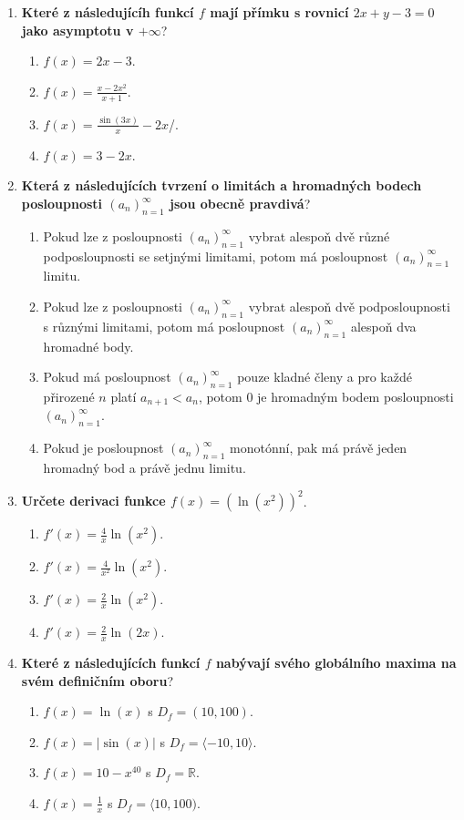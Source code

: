 \documentclass{article}
\begin{document}
\begin{enumerate}
    \item \textbf{Které z následujícíh funkcí $f$ mají přímku s rovnicí $2x + y - 3 = 0$ jako asymptotu v $+\infty$}?
    \begin{enumerate}
        \item $f(x) = 2x - 3$.
        \item $f(x) = \frac{x - 2x^2}{x+1}$.
        \item $f(x) = \frac{\sin(3x)}{x} - 2x$/.
        \item $f(x) = 3 - 2x$.
    \end{enumerate}

    \pagebreak
    
    \item \textbf{Která z následujících tvrzení o limitách a hromadných bodech posloupnosti $(a_n)_{n=1}^\infty$ jsou obecně pravdivá}?
    \begin{enumerate}
        \item Pokud lze z posloupnosti $(a_n)_{n=1}^\infty$ vybrat alespoň dvě různé podposloupnosti se setjnými limitami, potom má posloupnost $(a_n)_{n=1}^\infty$ limitu.
        \item Pokud lze z posloupnosti $(a_n)_{n=1}^\infty$ vybrat alespoň dvě podposloupnosti s různými limitami, potom má posloupnost $(a_n)_{n=1}^\infty$ alespoň dva hromadné body.
        \item Pokud má posloupnost $(a_n)_{n=1}^\infty$ pouze kladné členy a pro každé přirozené $n$ platí $a_{n+1} < a_n$, potom $0$ je hromadným bodem posloupnosti $(a_n)_{n=1}^\infty$.
        \item Pokud je posloupnost $(a_n)_{n=1}^\infty$ monotónní, pak má právě jeden hromadný bod a právě jednu limitu.
    \end{enumerate}

    \item \textbf{Určete derivaci funkce $f(x) = (\ln(x^2))^2$}.
    \begin{enumerate}
        \item $f'(x) = \frac{4}{x}\ln(x^2)$.
        \item $f'(x) = \frac{4}{x^2}\ln(x^2)$.
        \item $f'(x) = \frac{2}{x}\ln(x^2)$.
        \item $f'(x) = \frac{2}{x}\ln(2x)$.
    \end{enumerate}

    \item \textbf{Které z následujících funkcí $f$ nabývají svého globálního maxima na svém definičním oboru}?
    \begin{enumerate}
        \item $f(x) = \ln(x)$ s $D_f = (10,100)$.
        \item $f(x) = |\sin(x)|$ s $D_f = \langle -10, 10 \rangle$.
        \item $f(x) = 10 - x^{40}$ s $D_f = \mathbb{R}$.
        \item $f(x) = \frac{1}{x}$ s $D_f = \langle 10, 100)$.
    \end{enumerate}
\end{enumerate}
\end{document}
